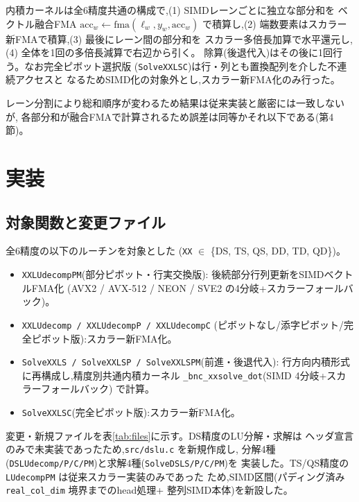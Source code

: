 \documentclass[a4j,dvipdfmx,11pt]{jsarticle}
\begin{document}
内積カーネルは全6精度共通の構成で,(1) SIMDレーンごとに独立な部分和を
ベクトル融合FMA $\mathrm{acc}_w \leftarrow \mathrm{fma}(\ell_w, y_w, \mathrm{acc}_w)$
で積算し,(2) 端数要素はスカラー新FMAで積算,(3) 最後にレーン間の部分和を
スカラー多倍長加算で水平還元し,(4) 全体を1回の多倍長減算で右辺から引く。
除算(後退代入)はその後に1回行う。なお完全ピボット選択版
(\texttt{SolveXXLSC})は行・列とも置換配列を介した不連続アクセスと
なるためSIMD化の対象外とし,スカラー新FMA化のみ行った。

レーン分割により総和順序が変わるため結果は従来実装と厳密には一致しないが,
各部分和が融合FMAで計算されるため誤差は同等かそれ以下である(第4節)。

\section{実装}

\subsection{対象関数と変更ファイル}

全6精度の以下のルーチンを対象とした
(\texttt{XX} $\in$ \{DS, TS, QS, DD, TD, QD\})。

\begin{itemize}
  \item \texttt{XXLUdecompPM}(部分ピボット・行実交換版):
        後続部分行列更新をSIMDベクトルFMA化
        (AVX2 / AVX-512 / NEON / SVE2 の4分岐+スカラーフォールバック)。
  \item \texttt{XXLUdecomp / XXLUdecompP / XXLUdecompC}
        (ピボットなし/添字ピボット/完全ピボット版):スカラー新FMA化。
  \item \texttt{SolveXXLS / SolveXXLSP / SolveXXLSPM}(前進・後退代入):
        行方向内積形式に再構成し,精度別共通内積カーネル
        \texttt{\_bnc\_xxsolve\_dot}(SIMD 4分岐+スカラーフォールバック)
        で計算。
  \item \texttt{SolveXXLSC}(完全ピボット版):スカラー新FMA化。
\end{itemize}

変更・新規ファイルを表\ref{tab:files}に示す。DS精度のLU分解・求解は
ヘッダ宣言のみで未実装であったため,\texttt{src/dslu.c} を新規作成し,
分解4種(\texttt{DSLUdecomp/P/C/PM})と求解4種(\texttt{SolveDSLS/P/C/PM})を
実装した。TS/QS精度の \texttt{LUdecompPM} は従来スカラー実装のみであった
ため,SIMD区間(パディング済み \texttt{real\_col\_dim} 境界までのhead処理+
整列SIMD本体)を新設した。
\end{document}
